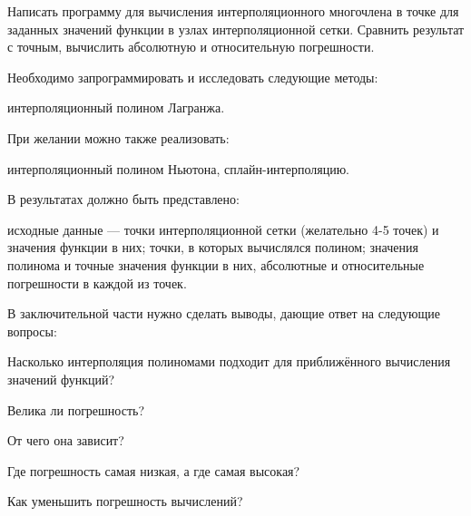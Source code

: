 \Practice

\Tasks

Написать программу для вычисления интерполяционного многочлена в точке
для заданных значений функции в узлах интерполяционной сетки. Сравнить
результат с точным, вычислить абсолютную и относительную погрешности.

Необходимо запрограммировать и исследовать следующие методы:

интерполяционный полином Лагранжа.

При желании можно также реализовать:

интерполяционный полином Ньютона, сплайн-интерполяцию.

В результатах должно быть представлено:

исходные данные — точки интерполяционной сетки (желательно 4-5 точек)
и значения функции в них; точки, в которых вычислялся полином; значения
полинома и точные значения функции в них, абсолютные и относительные
погрешности в каждой из точек.

В заключительной части нужно сделать выводы, дающие ответ на следующие
вопросы:

Насколько интерполяция полиномами подходит для приближённого
вычисления значений функций?

Велика ли погрешность?

От чего она зависит?

Где погрешность самая низкая, а где самая высокая?

Как уменьшить погрешность вычислений?

\Questions
